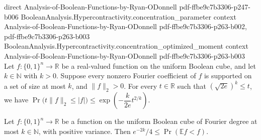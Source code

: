 \begin{theorem}
  {direct}
  {Analysis-of-Boolean-Functions-by-Ryan-ODonnell}
  {pdf-ffbe9c7b3306-p247-b006}
\proofstep
  {BooleanAnalysis.Hypercontractivity.concentration_parameter}
  {context}
  {Analysis-of-Boolean-Functions-by-Ryan-ODonnell}
  {pdf-ffbe9c7b3306-p263-b002,
    pdf-ffbe9c7b3306-p263-b003}
\proofstep
  {BooleanAnalysis.Hypercontractivity.concentration_optimized_moment}
  {context}
  {Analysis-of-Boolean-Functions-by-Ryan-ODonnell}
  {pdf-ffbe9c7b3306-p263-b003}
Let $f:\{0,1\}^n\to\mathbb R$ be a real-valued function on the uniform Boolean cube, and
let $k\in\mathbb N$ with $k>0$. Suppose every nonzero Fourier coefficient of $f$ is
supported on a set of size at most $k$, and $\|f\|_2>0$. For every $t\in\mathbb R$ such
that $(\sqrt{2e})^k\le t$, we have $\Pr\bigl(t\|f\|_2\le |f|\bigr)\le
\exp\!\left(-\dfrac{k}{2e}t^{2/k}\right)$.
\end{theorem}

\begin{theorem}
\leanok
{}
Let $f:\{0,1\}^n\to\mathbb R$ be a function on the uniform Boolean cube of Fourier degree at most $k\in\mathbb N$, with positive variance. Then $e^{-2k}/4\le\Pr(\mathbb Ef<f)$.
\end{theorem}

